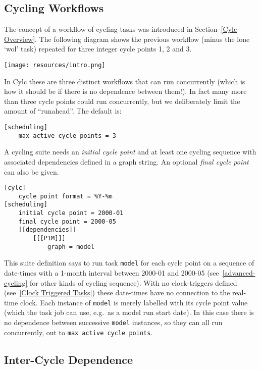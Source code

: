 \subsection{Cycling Workflows}

The concept of a workflow of cycling tasks was introduced in Section~\ref{Cylc
Overview}.  The following diagram shows the previous workflow (minus the lone
`wol' task) repeated for three integer cycle points 1, 2 and 3.

\begin{center}
\texttt{[image: resources/intro.png]} %
\end{center}

In Cylc these are three distinct workflows that can run concurrently (which is
how it should be if there is no dependence between them!). In fact many more
than three cycle points could run concurrently, but we deliberately limit the
amount of ``runahead''. The default is:
\begin{lstlisting}
[scheduling]
    max active cycle points = 3
\end{lstlisting}

A cycling suite needs an {\em initial cycle point} and at least one cycling
sequence with associated dependencies defined in a graph string. An optional
{\em final cycle point} can also be given.

\begin{lstlisting}[language=suiterc]
[cylc]
    cycle point format = %Y-%m
[scheduling]
    initial cycle point = 2000-01
    final cycle point = 2000-05
    [[dependencies]]
        [[[P1M]]]
            graph = model
\end{lstlisting}
This suite definition says to run task \lstinline=model= for each cycle point
on a sequence of date-times with a 1-month interval between 2000-01 and 2000-05 
(see~\ref{advanced-cycling} for other kinds of cycling sequence).
With no clock-triggers defined (see~\ref{Clock Triggered Tasks}) these
date-times have no connection to the real-time clock.  Each instance of
\lstinline=model= is merely labelled with its cycle point value (which the task
job can use, e.g.\ as a model run start date).  In this case
there is no dependence between successive \lstinline=model= instances, so they
can all run concurrently, out to \lstinline=max active cycle points=.

\subsection{Inter-Cycle Dependence}

